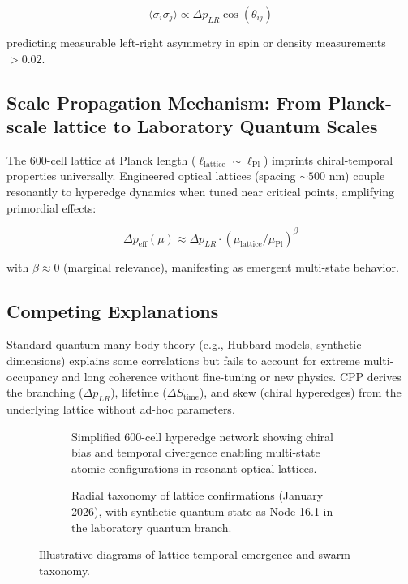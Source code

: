 \documentclass[11pt]{article}
\begin{document}
\[
\langle \sigma_i \sigma_j \rangle \propto \Delta p_{LR} \cos(\theta_{ij})
\]

predicting measurable left-right asymmetry in spin or density measurements $>0.02$.

\subsection{Scale Propagation Mechanism: From Planck-scale lattice to Laboratory Quantum Scales}
The 600-cell lattice at Planck length ($\ell_{\text{lattice}} \sim \ell_{\text{Pl}}$) imprints chiral-temporal properties universally. Engineered optical lattices (spacing $\sim 500$ nm) couple resonantly to hyperedge dynamics when tuned near critical points, amplifying primordial effects:

\[
\Delta p_{\text{eff}}(\mu) \approx \Delta p_{LR} \cdot (\mu_{\text{lattice}} / \mu_{\text{Pl}})^\beta
\]

with $\beta \approx 0$ (marginal relevance), manifesting as emergent multi-state behavior.

\subsection{Competing Explanations}
Standard quantum many-body theory (e.g., Hubbard models, synthetic dimensions) explains some correlations but fails to account for extreme multi-occupancy and long coherence without fine-tuning or new physics. CPP derives the branching ($\Delta p_{LR}$), lifetime ($\Delta S_{\text{time}}$), and skew (chiral hyperedges) from the underlying lattice without ad-hoc parameters.

\begin{figure}[htbp]
\centering
\begin{subfigure}{0.45\textwidth}
\centering
\caption{Simplified 600-cell hyperedge network showing chiral bias and temporal divergence enabling multi-state atomic configurations in resonant optical lattices.}
\label{fig:temporal-multi}
\end{subfigure}
\hfill
\begin{subfigure}{0.45\textwidth}
\centering
\caption{Radial taxonomy of lattice confirmations (January 2026), with synthetic quantum state as Node 16.1 in the laboratory quantum branch.}
\label{fig:taxonomy}
\end{subfigure}
\caption{Illustrative diagrams of lattice-temporal emergence and swarm taxonomy.}
\end{figure}
\end{document}
